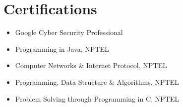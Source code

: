 \documentclass[]{roshan-resume}
\begin{document}
\begin{minipage}[t]{0.33\textwidth}
		
		\section{Certifications}
		\begin{itemize}
			\item Google Cyber Security Professional
			\item Programming in Java, NPTEL
			\item Computer Networks \& Internet Protocol, NPTEL
			\item Programming, Data Structure \& Algorithms, NPTEL
			\item Problem Solving through Programming in C, NPTEL
		\end{itemize}
		
		
		
	\end{minipage} 
	\hfill
\end{document}
